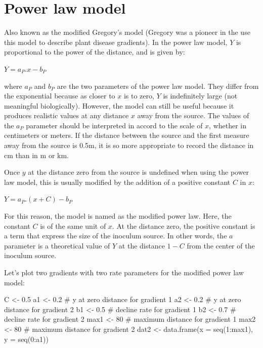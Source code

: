 \documentclass[
  letterpaper,
  DIV=11,
  numbers=noendperiod]{scrreprt}
\newenvironment{Shaded}{\begin{snugshade}}{\end{snugshade}}
\newcommand{\AttributeTok}[1]{\textcolor[rgb]{0.40,0.45,0.13}{#1}}
\newcommand{\CommentTok}[1]{\textcolor[rgb]{0.37,0.37,0.37}{#1}}
\newcommand{\DecValTok}[1]{\textcolor[rgb]{0.68,0.00,0.00}{#1}}
\newcommand{\FloatTok}[1]{\textcolor[rgb]{0.68,0.00,0.00}{#1}}
\newcommand{\FunctionTok}[1]{\textcolor[rgb]{0.28,0.35,0.67}{#1}}
\newcommand{\NormalTok}[1]{\textcolor[rgb]{0.00,0.23,0.31}{#1}}
\newcommand{\OtherTok}[1]{\textcolor[rgb]{0.00,0.23,0.31}{#1}}
\newcommand{\SpecialCharTok}[1]{\textcolor[rgb]{0.37,0.37,0.37}{#1}}
\begin{document}
\hypertarget{power-law-model}{%
\section{Power law model}\label{power-law-model}}

Also known as the modified Gregory's model (Gregory was a pioneer in the
use this model to describe plant disease gradients). In the power law
model, \(Y\) is proportional to the power of the distance, and is given
by:

\(Y = a_{P}.x - b_{P}\)

where \(a_{P}\) and \(b_{P}\) are the two parameters of the power law
model. They differ from the exponential because as closer to \(x\) is to
zero, \(Y\) is indefinitely large (not meaningful biologically).
However, the model can still be useful because it produces realistic
values at any distance \(x\) away from the source. The values of the
\(a_{P}\) parameter should be interpreted in accord to the scale of
\(x\), whether in centimeters or meters. If the distance between the
source and the first measure away from the source is 0.5m, it is so more
appropriate to record the distance in cm than in m or km.

Once \(y\) at the distance zero from the source is undefined when using
the power law model, this is usually modified by the addition of a
positive constant \(C\) in \(x\):

\(Y = a_{P}.(x + C) - b_{P}\)

For this reason, the model is named as the modified power law. Here, the
constant \(C\) is of the same unit of \(x\). At the distance zero, the
positive constant is a term that express the size of the inoculum
source. In other words, the \(a\) parameter is a theoretical value of
\(Y\) at the distance \(1-C\) from the center of the inoculum source.

Let's plot two gradients with two rate parameters for the modified power
law model:

\begin{Shaded}
\begin{Highlighting}[]
\NormalTok{C }\OtherTok{\textless{}{-}} \FloatTok{0.5}
\NormalTok{a1 }\OtherTok{\textless{}{-}} \FloatTok{0.2} \CommentTok{\# y at zero distance for gradient 1}
\NormalTok{a2 }\OtherTok{\textless{}{-}} \FloatTok{0.2} \CommentTok{\# y at zero distance for gradient 2}
\NormalTok{b1 }\OtherTok{\textless{}{-}} \FloatTok{0.5} \CommentTok{\# decline rate for gradient 1}
\NormalTok{b2 }\OtherTok{\textless{}{-}} \FloatTok{0.7} \CommentTok{\# decline rate for gradient 2}
\NormalTok{max1 }\OtherTok{\textless{}{-}} \DecValTok{80} \CommentTok{\# maximum distance for gradient 1}
\NormalTok{max2 }\OtherTok{\textless{}{-}} \DecValTok{80} \CommentTok{\# maximum distance for gradient 2}
\NormalTok{dat2 }\OtherTok{\textless{}{-}} \FunctionTok{data.frame}\NormalTok{(}\AttributeTok{x =} \FunctionTok{seq}\NormalTok{(}\DecValTok{1}\SpecialCharTok{:}\NormalTok{max1), }\AttributeTok{y =} \FunctionTok{seq}\NormalTok{(}\DecValTok{0}\SpecialCharTok{:}\NormalTok{a1))}
\end{Highlighting}
\end{Shaded}
\end{document}
